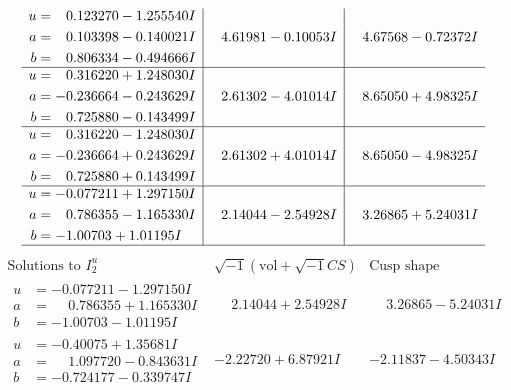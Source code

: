 \documentclass[1p]{elsarticle_modified}
\theoremstyle{definition}
\newcommand{\I}{\sqrt{-1}}
\begin{document}
$$\begin{array}{c|c|c}
\begin{aligned}
u &= \phantom{-}0.123270 - 1.255540 I \\
a &= \phantom{-}0.103398 - 0.140021 I \\
b &= \phantom{-}0.806334 - 0.494666 I\end{aligned}
 & \phantom{-}4.61981 - 0.10053 I & \phantom{-}4.67568 - 0.72372 I \\ \hline\begin{aligned}
u &= \phantom{-}0.316220 + 1.248030 I \\
a &= -0.236664 - 0.243629 I \\
b &= \phantom{-}0.725880 - 0.143499 I\end{aligned}
 & \phantom{-}2.61302 - 4.01014 I & \phantom{-}8.65050 + 4.98325 I \\ \hline\begin{aligned}
u &= \phantom{-}0.316220 - 1.248030 I \\
a &= -0.236664 + 0.243629 I \\
b &= \phantom{-}0.725880 + 0.143499 I\end{aligned}
 & \phantom{-}2.61302 + 4.01014 I & \phantom{-}8.65050 - 4.98325 I \\ \hline\begin{aligned}
u &= -0.077211 + 1.297150 I \\
a &= \phantom{-}0.786355 - 1.165330 I \\
b &= -1.00703 + 1.01195 I\end{aligned}
 & \phantom{-}2.14044 - 2.54928 I & \phantom{-}3.26865 + 5.24031 I\\
 \hline 
 \end{array}$$\newpage$$\begin{array}{c|c|c}  
\text{Solutions to }I^u_{2}& \I (\text{vol} + \sqrt{-1}CS) & \text{Cusp shape}\\
 \hline 
\begin{aligned}
u &= -0.077211 - 1.297150 I \\
a &= \phantom{-}0.786355 + 1.165330 I \\
b &= -1.00703 - 1.01195 I\end{aligned}
 & \phantom{-}2.14044 + 2.54928 I & \phantom{-}3.26865 - 5.24031 I \\ \hline\begin{aligned}
u &= -0.40075 + 1.35681 I \\
a &= \phantom{-}1.097720 - 0.843631 I \\
b &= -0.724177 - 0.339747 I\end{aligned}
 & -2.22720 + 6.87921 I & -2.11837 - 4.50343 I \\ \hline\begin{aligned}

\end{aligned}
\end{array}$$
\end{document}
